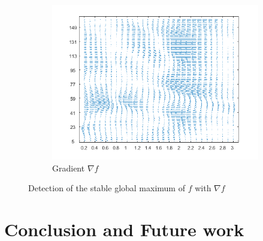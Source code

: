\documentclass[11pt,a4,twosided,singlespacing,titlepagenumber=on]{scrreprt}
\numberwithin{equation}{chapter} %
\theoremstyle{remark}
\begin{document}
\begin{figure}[H]
\begin{subfigure}[t]{0.49\textwidth}
        \includegraphics[width=1\textwidth]{surf/3}
        \caption{Gradient $\nabla f$}
        \label{vol_mod_sma}
    \end{subfigure}
    \caption{Detection of the stable global maximum of $f$ with $\nabla f$}
    \label{fig:sharpe_ratio_topology}
\end{figure}

\chapter{Conclusion and Future work}
\end{document}
